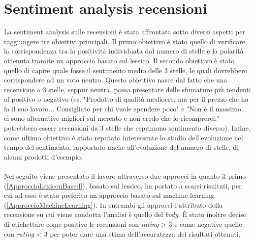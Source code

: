 \section{Sentiment analysis recensioni}\label{SentimentAnalysis}
La sentiment analysis sulle recensioni è stata affrontata sotto diversi aspetti per raggiungere tre obiettivi principali. Il primo obiettivo è stato quello di verificare la corrispondenza tra la positività individuata dal numero di stelle e la polarità ottenuta tramite un approccio basato sul lessico. Il secondo obiettivo è stato quello di capire quale fosse il sentimento medio delle 3 stelle, le quali dovrebbero corrispondere ad un voto neutro. Questo obiettivo nasce dal fatto che una recensione a 3 stelle, seppur neutra, possa presentare delle sfumature più tendenti al positivo o negativo (es: "Prodotto di qualità mediocre, ma per il prezzo che ha fa il suo lavoro... Consigliato per chi vuole spendere poco" e "Non è il massimo... ci sono alternative migliori sul mercato e non credo che lo ricomprerei." potrebbero essere recensioni da 3 stelle che esprimono sentimento diverso). Infine, come ultimo obiettivo è stato reputato interessente lo studio dell'evoluzione nel tempo del sentimento, rapportato anche all'evoluzione del numero di stelle, di alcuni prodotti d'esempio. 
\\\\
Nel seguito viene presentato il lavoro attraverso due approcci in quanto il primo (\ref{ApproccioLexiconBased}), basato sul lessico, ha portato a scarsi risultati, per cui ad esso è stato preferito un approccio basato sul machine learning (\ref{ApproccioMachineLearning}).
In entrambi gli approcci l'attributo della recensione su cui viene condotta l'analisi è quello del \textit{body}. È stato inoltre deciso di etichettare come positive le recensioni con \textit{rating} > 3 e come negative quelle con \textit{rating} < 3 per poter dare una stima dell'accuratezza dei risultati ottenuti.


